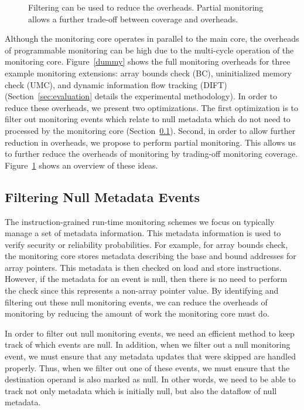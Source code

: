 \begin{figure}
\begin{center}
    \vspace{-0.2in}
    \caption{Filtering can be used to reduce the overheads. Partial monitoring
    allows a further trade-off between coverage and overheads.}
    \label{fig:optimizations.overview}
    \vspace{-0.1in}
  \end{center}
\end{figure}

Although the monitoring core operates in parallel to the main core, the
overheads of programmable monitoring can be high due to the multi-cycle
operation of the monitoring core.
Figure~\ref{dummy} shows the full
monitoring overheads for three example monitoring extensions: array bounds
check (BC), uninitialized memory check (UMC), and dynamic information flow
tracking (DIFT) (Section~\ref{sec:evaluation} details the experimental methodology). In order to reduce these overheads, we present two
optimizations. The first optimization is to filter out monitoring events which relate to
null metadata which do not need to processed by the monitoring core (Section~\ref{sec:optimizations.filter}). Second, in order to allow
further reduction in overheads, we propose to perform partial monitoring. This
allows us to further reduce the overheads of monitoring by trading-off
monitoring coverage. Figure~\ref{fig:optimizations.overview} shows an overview
of
these ideas.

\subsection{Filtering Null Metadata Events}
\label{sec:optimizations.filter}

The instruction-grained run-time monitoring schemes we focus on typically
manage a set of metadata information. This metadata information is used to
verify security or reliability probabilities. For example, for array bounds
check, the monitoring core stores metadata describing the base and bound
addresses for array pointers. This metadata is then checked on load and store
instructions. However, if the metadata for an event is null, then there is no need to perform the check since this represents a non-array pointer value. By
identifying and filtering out these null monitoring events, we can reduce the overheads of
monitoring by reducing the amount of work the monitoring core must do.

In order to filter out null monitoring events, we need an efficient method to
keep track of which events are null. In addition, when we filter out a null
monitoring event, we must ensure that any metadata updates that were skipped
are handled properly.  Thus, when we filter out one of
these events, we must ensure that the destination operand is also marked as null. 
In other words, we need to be able to track not only
metadata which is initially null, but also the dataflow of null metadata. 

